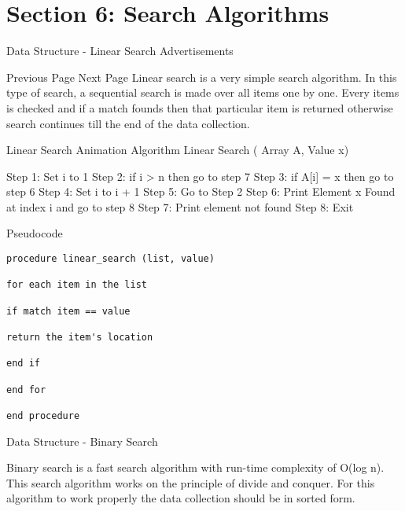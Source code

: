 \documentclass{beamer}
\begin{document}
\section{Section 6: Search Algorithms}
\begin{frame}
Data Structure - Linear Search
Advertisements

 
 Previous Page Next Page  
Linear search is a very simple search algorithm. In this type of search, a sequential search is made over all items one by one. Every items is checked and if a match founds then that particular item is returned otherwise search continues till the end of the data collection.
\end{frame}

\begin{frame}
Linear Search Animation
Algorithm
Linear Search ( Array A, Value x)

Step 1: Set i to 1
Step 2: if i > n then go to step 7
Step 3: if A[i] = x then go to step 6
Step 4: Set i to i + 1
Step 5: Go to Step 2
Step 6: Print Element x Found at index i and go to step 8
Step 7: Print element not found
Step 8: Exit
\end{frame}

\begin{frame}[fragile]
Pseudocode
\begin{verbatim}
procedure linear_search (list, value)

for each item in the list

if match item == value

return the item's location

end if

end for

end procedure 
\end{verbatim}

\end{frame}
\begin{frame}
Data Structure - Binary Search

Binary search is a fast search algorithm with run-time complexity of O(log n). This search algorithm works on the principle of divide and conquer. For this algorithm to work properly the data collection should be in sorted form.
\end{frame}
\end{document}
